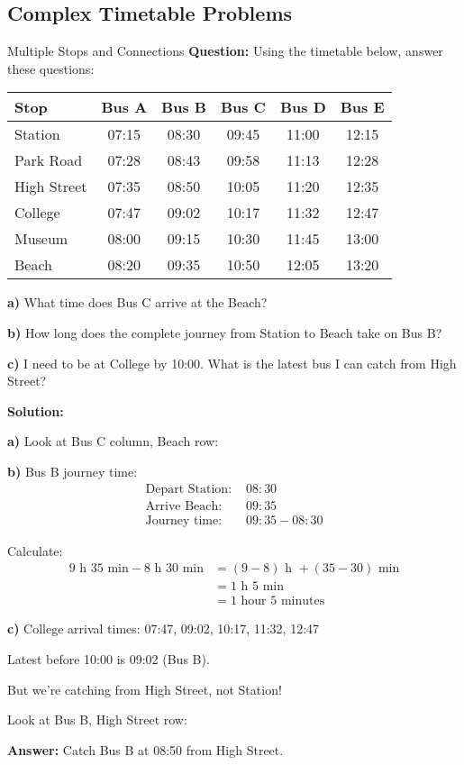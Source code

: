\documentclass[12pt,a4paper]{article}
\begin{document}
\subsection{Complex Timetable Problems}

\begin{examplebox}{Multiple Stops and Connections}
\textbf{Question:} Using the timetable below, answer these questions:

\begin{center}
\begin{tabular}{l|ccccc}
\toprule
\textbf{Stop} & \textbf{Bus A} & \textbf{Bus B} & \textbf{Bus C} & \textbf{Bus D} & \textbf{Bus E} \\
\midrule
Station & 07:15 & 08:30 & 09:45 & 11:00 & 12:15 \\
Park Road & 07:28 & 08:43 & 09:58 & 11:13 & 12:28 \\
High Street & 07:35 & 08:50 & 10:05 & 11:20 & 12:35 \\
College & 07:47 & 09:02 & 10:17 & 11:32 & 12:47 \\
Museum & 08:00 & 09:15 & 10:30 & 11:45 & 13:00 \\
Beach & 08:20 & 09:35 & 10:50 & 12:05 & 13:20 \\
\bottomrule
\end{tabular}
\end{center}

\textbf{a)} What time does Bus C arrive at the Beach?

\textbf{b)} How long does the complete journey from Station to Beach take on Bus B?

\textbf{c)} I need to be at College by 10:00. What is the latest bus I can catch from High Street?

\textbf{Solution:}

\textbf{a)} Look at Bus C column, Beach row: 

\textbf{b)} Bus B journey time:
\begin{align*}
\text{Depart Station: } &08:30 \\
\text{Arrive Beach: } &09:35 \\
\text{Journey time: } &09:35 - 08:30
\end{align*}

Calculate:
\begin{align*}
9\text{ h }35\text{ min} - 8\text{ h }30\text{ min} &= (9-8)\text{ h } + (35-30)\text{ min} \\
&= 1\text{ h }5\text{ min} \\
&= \boxed{1\text{ hour }5\text{ minutes}}
\end{align*}

\textbf{c)} College arrival times: 07:47, 09:02, 10:17, 11:32, 12:47

Latest before 10:00 is 09:02 (Bus B).

But we're catching from High Street, not Station!

Look at Bus B, High Street row: 

\textbf{Answer:} Catch Bus B at 08:50 from High Street.
\end{examplebox}
\end{document}
